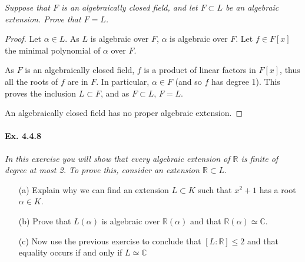 \documentclass[11pt,a4paper]{article}
\newcommand{\R}{\mathbb{R}}
\newcommand{\C}{\mathbb{C}}
\begin{document}
{\it Suppose that $F$ is an algebraically closed field, and let $F\subset L$ be an algebraic extension. Prove that $F=L$.
}

\begin{proof}
Let $\alpha \in L$. As $L$ is algebraic over $F$, $\alpha$ is algebraic over $F$. Let $f\in F[x]$ the minimal polynomial of $\alpha$ over $F$.

As $F$ is an algebraically closed field, $f$ is a product of linear factors in $F[x]$, thus all the roots of $f$ are in $F$. In particular, $\alpha \in F$ (and so $f$ has degree 1). This proves the inclusion $L \subset F$, and as  $F \subset L$, $F=L$.

An algebraically closed field has no proper algebraic extension.
\end{proof}

\paragraph{Ex. 4.4.8}

{\it In this exercise you will show that every algebraic extension of $\R$ is finite of degree at most 2. To prove this, consider an extension $\R\subset L$.
\begin{enumerate}
\item[(a)] Explain why we can find an extension $L\subset K$ such that $x^2+1$ has a root $\alpha \in K$.
\item[(b)] Prove that $L(\alpha)$ is algebraic over $\R(\alpha)$ and that $\R(\alpha) \simeq \C$.
\item[(c)] Now use the previous exercise to conclude that $[L:\R] \leq 2$ and that equality occurs if and only if $L\simeq \C$
\end{enumerate}
}
\end{document}
